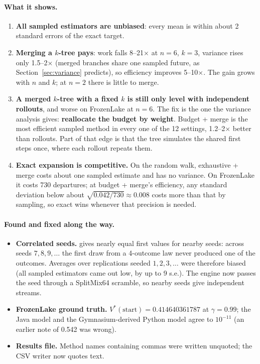 \paragraph{What it shows.}
\begin{enumerate}
\item \textbf{All sampled estimators are unbiased}: every mean is within about 2 standard errors of the exact target.
\item \textbf{Merging a $k$-tree pays}: work falls 8--21$\times$ at $n=6$, $k=3$, variance rises only 1.5--2$\times$ (merged
  branches share one sampled future, as Section~\ref{sec:variance} predicts), so efficiency improves 5--10$\times$. The
  gain grows with $n$ and $k$; at $n=2$ there is little to merge.
\item \textbf{A merged $k$-tree with a fixed $k$ is still only level with independent rollouts}, and worse on FrozenLake
  at $n=6$. The fix is the one the variance analysis gives: \textbf{reallocate the budget by weight}. Budget + merge is
  the most efficient sampled method in every one of the 12 settings, 1.2--2$\times$ better than rollouts. Part of that
  edge is that the tree simulates the shared first steps once, where each rollout repeats them.
\item \textbf{Exact expansion is competitive.} On the random walk, exhaustive + merge costs about one sampled estimate
  and has no variance. On FrozenLake it costs 730 departures; at budget + merge's efficiency, any standard deviation
  below about $\sqrt{0.042/730}\approx0.008$ costs more than that by sampling, so exact wins whenever that precision
  is needed.
\end{enumerate}

\paragraph{Found and fixed along the way.}
\begin{itemize}
\item \textbf{Correlated seeds.}  gives nearly equal first values for nearby seeds: across seeds
  $7,8,9,\dots$ the first draw from a 4-outcome law never produced one of the outcomes. Averages over replications
  seeded $1,2,3,\dots$ were therefore biased (all sampled estimators came out low, by up to 9 s.e.). The engine now
  passes the seed through a SplitMix64 scramble, so nearby seeds give independent streams.
\item \textbf{FrozenLake ground truth.} $V^*(\text{start})=0.414640361787$ at $\gamma=0.99$; the Java model and the
  Gymnasium-derived Python model agree to $10^{-11}$ (an earlier note of 0.542 was wrong).
\item \textbf{Results file.} Method names containing commas were written unquoted; the CSV writer now quotes text.
\end{itemize}

